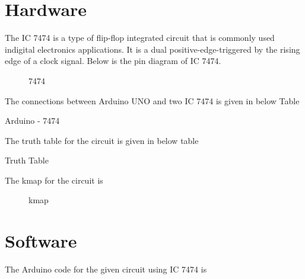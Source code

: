 \documentclass{article}
\begin{document}
\section{Hardware}
	The IC 7474 is a type of flip-flop integrated circuit that is commonly used indigital electronics applications. It is a dual positive-edge-triggered by the rising edge of a clock signal. Below is the pin diagram of IC 7474. \\
		\begin{figure}[h]
			\centering
		
			\caption{7474}
			\label{fig:2}
		\end{figure}

	The connections between Arduino UNO and two IC 7474 is given in below Table \\
	\begin{table}[h]
		\begin{center}
	
			\caption{Arduino - 7474}
			\label{table:1}
		\end{center}
	\end{table}

	The truth table for the circuit is given in below table \\
	
		\begin{table}[h]
		\begin{center}
			
			\caption{Truth Table}
			\label{table:2}
		\end{center}
		\end{table}

		The kmap for the circuit is \\
		\begin{figure}[h]
			\centering
			
			\caption{kmap}
			\label{fig:3}
		\end{figure}
\section{Software}
	The Arduino code for the given circuit using IC 7474 is \\
	
\end{document}
